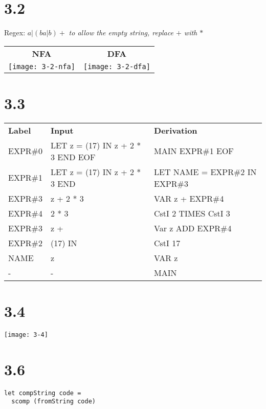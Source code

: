 \documentclass{article}
\begin{document}
\section*{3.2}

Regex: $a|(ba|b)+$
\newline\textit{to allow the empty string, replace $+$ with $*$}

\vspace{10 mm}

\begin{tabular}{c c}
\textbf{NFA} & \textbf{DFA} \\
\texttt{[image: 3-2-nfa]} & \texttt{[image: 3-2-dfa]}
\end{tabular}

\section*{3.3}

\begin{tabular}{l l l}
\textbf{Label} & \textbf{Input} & \textbf{Derivation} \\
EXPR\#0 & LET z = (17) IN z + 2 * 3 END EOF & MAIN EXPR\#1 EOF \\
EXPR\#1 & LET z = (17) IN z + 2 * 3 END & LET NAME = EXPR\#2 IN EXPR\#3 \\
EXPR\#3 & z + 2 * 3 & VAR z + EXPR\#4 \\
EXPR\#4 & 2 * 3 & CstI 2 TIMES CstI 3 \\
EXPR\#3 & z + & Var z ADD EXPR\#4 \\
EXPR\#2 & (17) IN & CstI 17 \\
NAME    & z & VAR z \\
-       & - & MAIN

\end{tabular}

\section*{3.4}

\texttt{[image: 3-4]}

\section*{3.6}

\begin{verbatim}
let compString code =
  scomp (fromString code)
\end{verbatim}
\end{document}
